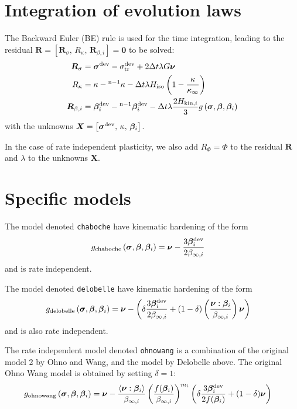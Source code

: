 \documentclass[10pt,a4paper]{article}
\begin{document}
\section{Integration of evolution laws}
The Backward Euler (BE) rule is used for the time integration, leading to the residual $\bm{R}=\left[\bm{R}_\sigma,\,R_\kappa,\,\bm{R}_{\beta,i}\right]=\bm{0}$ to be solved:
\begin{align}
\bm{R}_\sigma &= \ts{\sigma}\dev - \sigma\dev\trial + 2\Delta t \lambda G \ts{\nu} \\
R_\kappa &= \kappa - \old{\kappa} - \Delta t \lambda H\iso\left(1 - \frac{\kappa}{\kappa_\infty} \right) \\
\bm{R}_{\beta,i} &= \ts{\beta}\inds{i}\dev - \old{\ts{\beta}\inds{i}\dev} - \Delta t \lambda \frac{2H\kini}{3} g\left(\ts{\sigma}, \ts{\beta}, \ts{\beta}\inds{i}\right)
\end{align}
with the unknowns $\bm{X} = \left[\bm{\sigma}^{\mathrm{dev}},\,\kappa,\,\bm{\beta}_{i}\right]$. 

In the case of rate independent plasticity, we also add $R_\Phi=\Phi$ to the residual $\bm{R}$ and $\lambda$ to the unknowns $\bm{X}$. 

\section{Specific models}
The model denoted \nolinkurl{chaboche} have kinematic hardening of the form
\begin{align}
g_{\mathrm{chaboche}}\left(\bm{\sigma}, \bm{\beta}, \bm{\beta}_{i}\right) &= \bm{\nu} - \frac{3\bm{\beta}^{\mathrm{dev}}_{i}}{2\beta_{\infty,i}}
\end{align}
and is rate independent.


The model denoted \nolinkurl{delobelle} have kinematic hardening of the form
\begin{align}
g_{\mathrm{delobelle}}\left(\bm{\sigma}, \bm{\beta}, \bm{\beta}_{i}\right) &= \bm{\nu} -\left( \delta \frac{3\bm{\beta}^{\mathrm{dev}}_{i}}{2\beta_{\infty,i}} + (1-\delta)\left(\frac{\bm{\nu}:\bm{\beta}_{i}}{\beta_{\infty,i}}\right)\bm{\nu}\right)
\end{align}
and is also rate independent. 


The rate independent model denoted \nolinkurl{ohnowang} is a combination of the original model 2 by Ohno and Wang, and the model by Delobelle above. The original Ohno Wang model is obtained by setting $\delta=1$:
\begin{align}
g_{\mathrm{ohnowang}}\left(\bm{\sigma}, \bm{\beta}, \bm{\beta}_{i}\right) &= \bm{\nu} - \frac{\left\langle \bm{\nu}:\bm{\beta}_{i} \right\rangle}{\beta_{\infty,i}}\left(\frac{f(\bm{\beta}_{i})}{\beta_{\infty,i}} \right)^{m_{i}}\left(\delta \frac{3\bm{\beta}^{\mathrm{dev}}_{i}}{2f(\bm{\beta}_{i})} + (1-\delta)\bm{\nu}\right)
\end{align}
\end{document}
